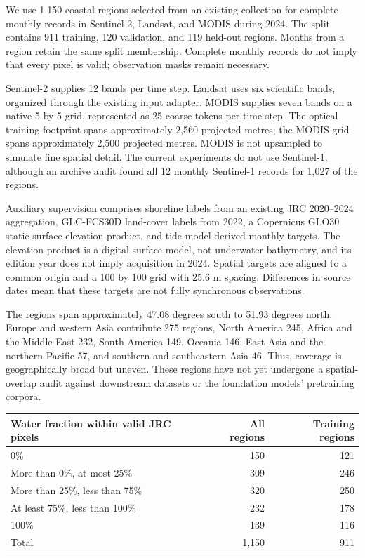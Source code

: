 \documentclass[
  10pt,
  english,
]{article}
\begin{document}
We use 1,150 coastal regions selected from an existing collection for
complete monthly records in Sentinel-2, Landsat, and MODIS during 2024.
The split contains 911 training, 120 validation, and 119 held-out
regions. Months from a region retain the same split membership. Complete
monthly records do not imply that every pixel is valid; observation
masks remain necessary.

Sentinel-2 supplies 12 bands per time step. Landsat uses six scientific
bands, organized through the existing input adapter. MODIS supplies
seven bands on a native 5 by 5 grid, represented as 25 coarse tokens per
time step. The optical training footprint spans approximately 2,560
projected metres; the MODIS grid spans approximately 2,500 projected
metres. MODIS is not upsampled to simulate fine spatial detail. The
current experiments do not use Sentinel-1, although an archive audit
found all 12 monthly Sentinel-1 records for 1,027 of the regions.

Auxiliary supervision comprises shoreline labels from an existing JRC
2020--2024 aggregation, GLC-FCS30D land-cover labels from 2022, a
Copernicus GLO30 static surface-elevation product, and
tide-model-derived monthly targets. The elevation product is a digital
surface model, not underwater bathymetry, and its edition year does not
imply acquisition in 2024. Spatial targets are aligned to a common
origin and a 100 by 100 grid with 25.6 m spacing. Differences in source
dates mean that these targets are not fully synchronous observations.

The regions span approximately 47.08 degrees south to 51.93 degrees
north. Europe and western Asia contribute 275 regions, North America
245, Africa and the Middle East 232, South America 149, Oceania 146,
East Asia and the northern Pacific 57, and southern and southeastern
Asia 46. Thus, coverage is geographically broad but uneven. These
regions have not yet undergone a spatial-overlap audit against
downstream datasets or the foundation models' pretraining corpora.

\begin{longtable}[]{@{}lrr@{}}
\toprule
Water fraction within valid JRC pixels & All regions & Training
regions \\
\midrule
\endhead
0\% & 150 & 121 \\
More than 0\%, at most 25\% & 309 & 246 \\
More than 25\%, less than 75\% & 320 & 250 \\
At least 75\%, less than 100\% & 232 & 178 \\
100\% & 139 & 116 \\
Total & 1,150 & 911 \\
\bottomrule
\end{longtable}
\end{document}
